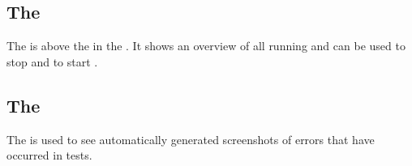 \subsection{The \gdrunautview{}}
The \gdrunautview{} is above the \gdtestsuitebrowser{} in the \specpersp{}. It shows an overview of all running \gdauts{} and can be used to stop \gdauts{} and to start \gdsuites{}.  

\subsection{The \gdimgview{}}
The \gdimgview{} is used to see automatically generated screenshots of errors that have occurred in tests.
